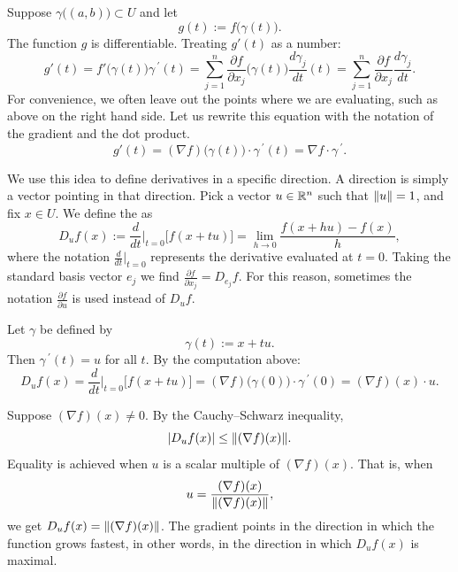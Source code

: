 Suppose $\gamma\bigl((a,b)\bigr) \subset U$ and let
\begin{equation*}
g(t) := f\bigl(\gamma(t)\bigr) .
\end{equation*}
The function
$g$ is differentiable. Treating $g'(t)$ as a number:
\begin{equation*}
g'(t) =
f'\bigl(\gamma(t)\bigr) \gamma^{\:\prime}(t)
=
\sum_{j=1}^n
\frac{\partial f}{\partial x_j} \bigl(\gamma(t)\bigr)
\frac{d\gamma_j}{dt} (t)
=
\sum_{j=1}^n
\frac{\partial f}{\partial x_j}
\frac{d\gamma_j}{dt} .
\end{equation*}
For convenience,
we often 
leave out the points where we are evaluating,
such as above on the right hand side.
Let us rewrite this equation
with the notation of the gradient and the dot product.
\begin{equation*}
g'(t) = (\nabla f) \bigl(\gamma(t)\bigr) \cdot \gamma^{\:\prime}(t)
= \nabla f \cdot \gamma^{\:\prime}.
\end{equation*}

We use this idea to define derivatives in a specific direction.  A direction
is simply a vector pointing in that direction.  Pick a vector $u \in {\mathbb{R}}^n$
such that $\lVert {u} \rVert = 1$, and fix $x \in U$.
We define the
\emph{} as
\begin{equation*}
D_u f (x) := \frac{d}{dt}\Big|_{t=0} \bigl[ f(x+tu) \bigr] =
\lim_{h\to 0}
\frac{f(x+hu)-f(x)}{h} ,
\end{equation*}
where the notation
$\frac{d}{dt}\big|_{t=0}$ represents the derivative evaluated at $t=0$.
Taking the standard basis vector $e_j$ we find
$\frac{\partial f}{\partial x_j} = D_{e_j} f$.
For this reason, sometimes the notation $\frac{\partial f}{\partial u}$
is used instead of $D_u f$.

Let $\gamma$ be defined by
\begin{equation*}
\gamma(t) := x + tu .
\end{equation*}
Then $\gamma^{\:\prime}(t) = u$ for all $t$.  
By the computation above:
\begin{equation*}
D_u f (x) =
\frac{d}{dt}\Big|_{t=0} \bigl[ f(x+tu) \bigr] =
(\nabla f) \bigl(\gamma(0)\bigr) \cdot \gamma^{\:\prime}(0)
=
(\nabla f) (x) \cdot u .
\end{equation*}

Suppose $(\nabla f)(x) \neq 0$.
By the Cauchy--Schwarz inequality,
\begin{equation*}
\lvert {D_u f(x)} \rvert \leq \lVert {(\nabla f)(x)} \rVert .
\end{equation*}
Equality is achieved when $u$ is a scalar multiple of
$(\nabla f)(x)$.  That is, when
\begin{equation*}
u = 
\frac{(\nabla f)(x)}{\lVert {(\nabla f)(x)} \rVert} ,
\end{equation*}
we get $D_u f(x) = \lVert {(\nabla f)(x)} \rVert$.
The gradient points in the direction in which the
function grows fastest, in other words,
in the direction in which $D_u f(x)$ is maximal.


